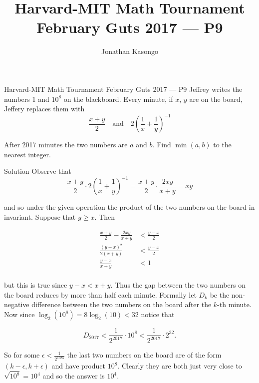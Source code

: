 \documentclass{article}
\author{Jonathan Kasongo}
\title{Harvard-MIT Math Tournament February Guts 2017 --- P9}
\begin{document}
\maketitle

\begin{problem}{Harvard-MIT Math Tournament February Guts 2017 --- P9}
Jeffrey writes the numbers 1 and $10^8$ on
the blackboard. Every minute, if $x$, $y$ are on the board, Jeffery
replaces them with
$$
\frac{x+y}{2} \quad \text{and} \quad
2\left( \frac{1}{x} + \frac{1}{y} \right)^{-1}
$$

After 2017 minutes the two numbers are $a$ and $b$. Find $\min(a, b)$ to
the nearest integer.
\end{problem}

\begin{solution}{Solution}
Observe that
$$
\frac{x+y}{2}\cdot 2\left( \frac{1}{x} + \frac{1}{y} \right)^{-1}
=
\frac{x+y}{2}\cdot \frac{2xy}{x+y} = xy
$$

and so under the given operation the product of the two numbers on the
board in invariant. Suppose that $y\geq x$. Then

\[
\begin{aligned}
\frac{x+y}{2} - \frac{2xy}{x+y} &< \frac{y-x}{2} \\
\frac{(y-x)^2}{2(x+y)} &< \frac{y-x}{2} \\
\frac{y-x}{x+y} &< 1 \\
\end{aligned}
\]

but this is true since $y-x < x+y$. Thus the gap between the two numbers
on the board reduces by more than half each minute. Formally let
$D_k$ be the non-negative difference between the two numbers on the
board after the $k$-th minute. Now since
$\log_2(10^8) = 8\log_2(10) < 32$ notice that

$$
D_{2017} < \frac{1}{2^{2017}}\cdot 10^8 < \frac{1}{2^{2017}}\cdot 2^{32}.
$$

So for some $\epsilon < \frac{1}{2^{1985}}$ the last two numbers on the
board are of the form $(k-\epsilon, k+\epsilon)$ and have product $10^8$.
Clearly they are both just very close to $\sqrt{10^8} = 10^4$ and so
the answer is $10^4$.
\end{solution}
\end{document}
